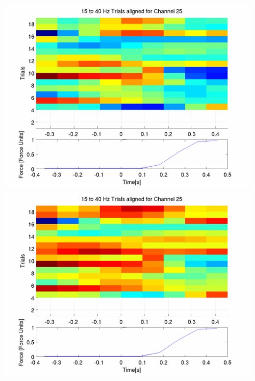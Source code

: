 \documentclass[12pt]{article}
\begin{document}
\includegraphics[scale=0.2]{noCAR/log_plot_2_aligned_trials.png}
\includegraphics[scale=0.2]{WithCAR/log_plot_2_aligned_trials.png}
\end{document}
